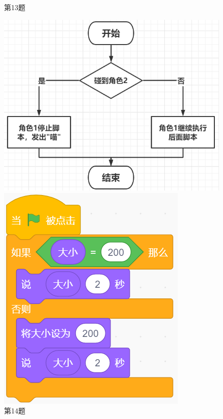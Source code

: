 \documentclass[10pt, a4paper]{article}
\begin{document}
\begin{enumerate}
\begin{figure}[htbp]
\begin{minipage}[t]{.08\textwidth}
                \caption*{第13题}
            \end{minipage}
            \begin{minipage}[t]{.22\textwidth}
                \centering
                \includegraphics[width=\textwidth]{14.png}
                \caption*{第14题}
            \end{minipage}
            \begin{minipage}[t]{.15\textwidth}
                \centering
                \includegraphics[width=\textwidth]{16.png}

\end{minipage}
\end{figure}
\end{enumerate}
\end{document}
